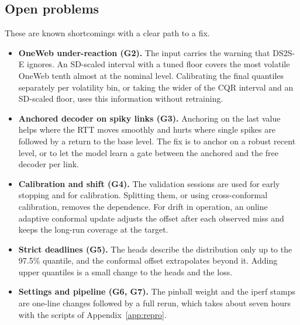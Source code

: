 \subsection{Open problems}
These are known shortcomings with a clear path to a fix.
\begin{itemize}[leftmargin=*]
  \item \textbf{OneWeb under-reaction (G2).} The input carries the warning that DS2S-E ignores. An SD-scaled interval with a tuned floor covers the most volatile OneWeb tenth almost at the nominal level. Calibrating the final quantiles separately per volatility bin, or taking the wider of the CQR interval and an SD-scaled floor, uses this information without retraining.
  \item \textbf{Anchored decoder on spiky links (G3).} Anchoring on the last value helps where the RTT moves smoothly and hurts where single spikes are followed by a return to the base level. The fix is to anchor on a robust recent level, or to let the model learn a gate between the anchored and the free decoder per link.
  \item \textbf{Calibration and shift (G4).} The validation sessions are used for early stopping and for calibration. Splitting them, or using cross-conformal calibration, removes the dependence. For drift in operation, an online adaptive conformal update adjusts the offset after each observed miss and keeps the long-run coverage at the target.
  \item \textbf{Strict deadlines (G5).} The heads describe the distribution only up to the 97.5\% quantile, and the conformal offset extrapolates beyond it. Adding upper quantiles is a small change to the heads and the loss.
  \item \textbf{Settings and pipeline (G6, G7).} The pinball weight and the iperf stamps are one-line changes followed by a full rerun, which takes about seven hours with the scripts of Appendix~\ref{app:repro}.
\end{itemize}


